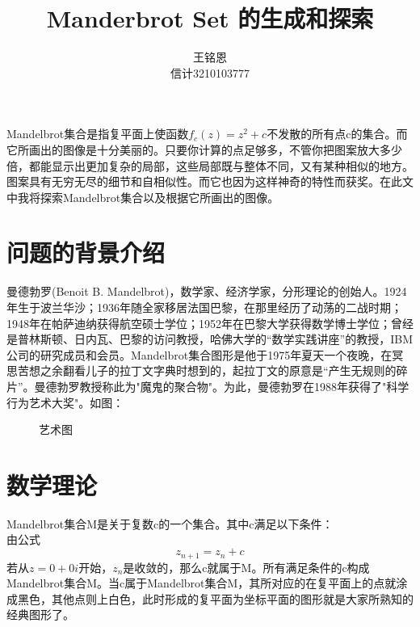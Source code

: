 \documentclass{ctexart}
\title{Manderbrot Set 的生成和探索}
\author{王铭恩\\信计3210103777}
\begin{document}
\maketitle

\begin{abstract}




\end{abstract}
Mandelbrot集合是指复平面上使函数$f_c(z)=z^2+c$不发散的所有点c的集合\cite{Mandelbrot_set}。而它所画出的图像是十分美丽的。只要你计算的点足够多，不管你把图案放大多少倍，都能显示出更加复杂的局部，这些局部既与整体不同，又有某种相似的地方。图案具有无穷无尽的细节和自相似性。而它也因为这样神奇的特性而获奖。在此文中我将探索Mandelbrot集合以及根据它所画出的图像。

\section{问题的背景介绍}
曼德勃罗(Benoit B. Mandelbrot)，数学家、经济学家，分形理论的创始人。1924年生于波兰华沙；1936年随全家移居法国巴黎，在那里经历了动荡的二战时期；1948年在帕萨迪纳获得航空硕士学位；1952年在巴黎大学获得数学博士学位；曾经是普林斯顿、日内瓦、巴黎的访问教授，哈佛大学的“数学实践讲座”的教授，IBM公司的研究成员和会员\cite{Mandelbrot}。Mandelbrot集合图形是他于1975年夏天一个夜晚，在冥思苦想之余翻看儿子的拉丁文字典时想到的，起拉丁文的原意是“产生无规则的碎片”。曼德勃罗教授称此为"魔鬼的聚合物"。为此，曼德勃罗在1988年获得了"科学行为艺术大奖"\cite{birth_Mandelbrot_set}。如图：
\begin{figure}[htbp]
\centering
{}
\caption{艺术图}
\end{figure}
\section{数学理论}
Mandelbrot集合M是关于复数c的一个集合。其中c满足以下条件：\\
由公式
\begin{equation}
z_{n+1}=z_{n}+c
\end{equation}
若从$z=0+0i$开始，$z_n$是收敛的，那么c就属于M。所有满足条件的c构成Mandelbrot集合M。当c属于Mandelbrot集合M，其所对应的在复平面上的点就涂成黑色，其他点则上白色，此时形成的复平面为坐标平面的图形就是大家所熟知的经典图形了。
\end{document}
